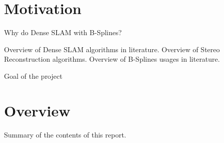 \section{Motivation}

Why do Dense SLAM with B-Splines?

Overview of Dense SLAM algorithms in literature.
Overview of Stereo Reconstruction algorithms.
Overview of B-Splines usages in literature.

Goal of the project

\section{Overview}

Summary of the contents of this report.
